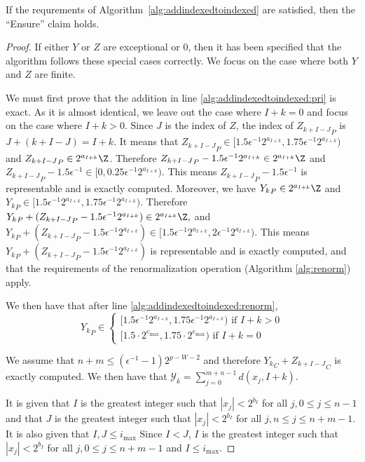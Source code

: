     \begin{lem}
      If the requrements of Algorithm~\ref{alg:addindexedtoindexed} are satisfied, then the ``Ensure'' claim holds.
      \label{lem:reduce}
    \end{lem}
    \begin{proof}
      If either $Y$ or $Z$ are exceptional or 0, then it has been specified that the algorithm follows these special cases correctly. We focus on the case where both $Y$ and $Z$ are finite.

      We must first prove that the addition in line \ref{alg:addindexedtoindexed:pri} is exact. As it is almost identical, we leave out the case where $I + k = 0$ and focus on the case where $I + k > 0$.
      Since $J$ is the index of $Z$, the index of ${Z_{k + I-J}}_P$ is
      $J + (k + I -J) = I + k$. It means that
      \(
        {Z_{k + I-J}}_P \in [1.5 \epsilon^{-1} 2^{a_{I+k}}, 1.75 \epsilon^{-1} 2^{a_{I+k}})
      \)
      and ${Z_{k + I-J}}_P \in 2^{a_{I+k}} \Z$.
      Therefore ${Z_{k + I-J}}_P - 1.5 \epsilon^{-1}  2^{a_{I+k}} \in 2^{a_{I+k}} \Z$
      and ${Z_{k + I-J}}_P - 1.5 \epsilon^{-1} \in [0, 0.25 \epsilon^{-1} 2^{a_{I+k}})$.
      This means ${Z_{k + I-J}}_P - 1.5 \epsilon^{-1}$ is representable and is
      exactly computed.
      Moreover, we have ${Y_{k}}_P \in 2^{a_{I+k}} \Z$ and
      \(
        {Y_{k}}_P \in [1.5 \epsilon^{-1} 2^{a_{I+k}}, 1.75 \epsilon^{-1} 2^{a_{I+k}})
      \).
      Therefore
      \(
        {Y_{k}}_P + ({Z_{k + I-J}}_P - 1.5 \epsilon^{-1}  2^{a_{I+k}})
          \in 2^{a_{I+k}} \Z,
      \)
      and
      \(
        {Y_{k}}_P + ({Z_{k + I-J}}_P - 1.5 \epsilon^{-1}  2^{a_{I+k}})
          \in [1.5 \epsilon^{-1} 2^{a_{I+k}}, 2 \epsilon^{-1} 2^{a_{I+k}})
      \).
      This means ${Y_{k}}_P + ({Z_{k + I-J}}_P - 1.5 \epsilon^{-1}  2^{a_{I+k}})$
      is representable and is exactly computed, and that the requirements of the renormalization operation (Algorithm \ref{alg:renorm}) apply.

      We then have that after line \ref{alg:addindexedtoindexed:renorm}, \[
          {Y_k}_P \in \begin{cases}[1.5  \epsilon^{-1} 2^{a_{I + k}}, 1.75  \epsilon^{-1} 2^{a_{I + k}}) \text{ if } I + k > 0 \\ [1.5 \cdot 2^{e_{\max}}, 1.75 \cdot 2^{e_{\max}}) \text{ if } I + k = 0\end{cases}
      \]

      We assume that $n + m \leq (\epsilon^{-1} - 1)2^{p - W - 2}$ and therefore ${Y_{k}}_C + {Z_{k + I-J}}_C$ is exactly computed. We then have that $\mathcal{Y}_k = \sum\limits_{j = 0}^{m + n - 1} d(x_j, I + k)$.

      It is given that $I$ is the greatest integer such that $|x_j| < 2^{b_I}$ for all $j, 0 \leq j \leq n - 1$ and that $J$ is the greatest integer such that $|x_j| < 2^{b_I}$ for all $j, n \leq j \leq n + m - 1$. It is also given that $I, J \leq i_{\max}$
      Since $I < J$, $I$ is the greatest integer such that $|x_j| < 2^{b_I}$ for all $j, 0 \leq j \leq n + m - 1$ and $I \leq i_{\max}$.
    \end{proof}
